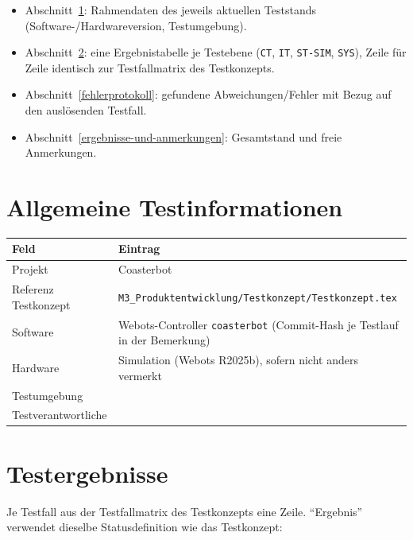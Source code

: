 \documentclass[
  a4paper,
  12pt,
  DIV=12,        %
  parskip=half,  %
  headings=small %
]{scrartcl}
\theoremstyle{definition}
\providecommand{\tightlist}{%
  \setlength{\itemsep}{0pt}\setlength{\parskip}{0pt}}
\theoremstyle{definition}
\begin{document}
\begin{itemize}
\tightlist
\item
  Abschnitt~\ref{allgemeine-testinformationen}: Rahmendaten des jeweils
  aktuellen Teststands (Software-/Hardwareversion, Testumgebung).
\item
  Abschnitt~\ref{testergebnisse}: eine Ergebnistabelle je Testebene
  (\texttt{CT}, \texttt{IT}, \texttt{ST-SIM}, \texttt{SYS}), Zeile für
  Zeile identisch zur Testfallmatrix des Testkonzepts.
\item
  Abschnitt~\ref{fehlerprotokoll}: gefundene Abweichungen/Fehler mit
  Bezug auf den auslösenden Testfall.
\item
  Abschnitt~\ref{ergebnisse-und-anmerkungen}: Gesamtstand und
  freie Anmerkungen.
\end{itemize}

\section{Allgemeine Testinformationen}\label{allgemeine-testinformationen}

\begin{longtable}[]{@{}p{}p{}@{}}
\toprule
\textbf{Feld} & \textbf{Eintrag}\\
\midrule
\endhead
\bottomrule
\endfoot
Projekt & Coasterbot\\
Referenz Testkonzept & \footnotesize\texttt{M3\_Produktentwicklung/Testkonzept/Testkonzept.tex}\\
Software & Webots-Controller \texttt{coasterbot} (Commit-Hash je Testlauf in der Bemerkung)\\
Hardware & Simulation (Webots R2025b), sofern nicht anders vermerkt\\
Testumgebung & \\
Testverantwortliche & \\
\end{longtable}

\section{Testergebnisse}\label{testergebnisse}

Je Testfall aus der Testfallmatrix des Testkonzepts eine Zeile.
\enquote{Ergebnis} verwendet dieselbe Statusdefinition wie das
Testkonzept:
\end{document}

